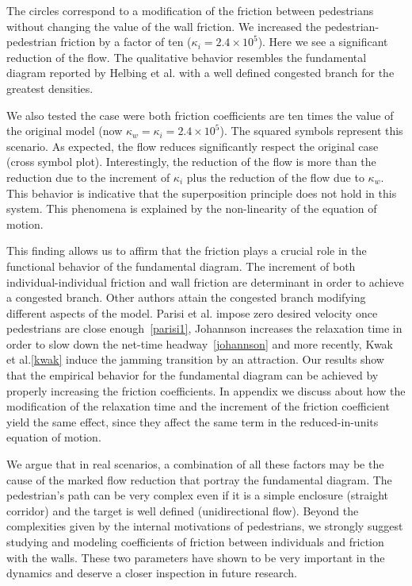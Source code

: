 The circles correspond to a modification of the friction between pedestrians without changing the value of the wall friction. We increased the pedestrian-pedestrian friction by a factor of ten ($\kappa_i = 2.4\times10^{5}$). Here we see a significant reduction of the flow. The qualitative behavior resembles the fundamental diagram reported by Helbing et al. with a well defined congested branch for the greatest densities.

We also tested the case were both friction coefficients are ten times the value of the original model (now $\kappa_w = \kappa_i = 2.4\times10^{5}$). The squared symbols represent this scenario. As expected, the flow reduces significantly respect the original case (cross symbol plot). Interestingly, the reduction of the flow is more than the reduction due to the increment of $\kappa_i$ plus the reduction of the flow due to $\kappa_w$. This behavior is indicative that the superposition principle does not hold in this system. This phenomena is explained by the non-linearity of the equation of motion.   

This finding allows us to affirm that the friction plays a crucial role in the functional behavior of the fundamental diagram. The increment of both individual-individual friction and wall friction are determinant in order to achieve a congested branch. Other authors attain the congested branch modifying different aspects of the model. Parisi et al. impose zero desired velocity once pedestrians are close enough~\ref{parisi1}, Johannson increases the relaxation time in order to slow down the net-time headway~\ref{johannson} and more recently, Kwak et al.\ref{kwak} induce the jamming transition by an attraction. Our results show that the empirical behavior for the fundamental diagram can be achieved by properly increasing the friction coefficients. In appendix we discuss about how the modification of the relaxation time and the increment of the friction coefficient yield the same effect, since they affect the same term in the reduced-in-units equation of motion.  

We argue that in real scenarios, a combination of all these factors may be the cause of the marked flow reduction that portray the fundamental diagram. The pedestrian's path can be very complex even if it is a simple enclosure (straight corridor) and the target is well defined (unidirectional flow). Beyond the complexities given by the internal motivations of pedestrians, we strongly suggest studying and modeling coefficients of friction between individuals and friction with the walls. These two parameters have shown to be very important in the dynamics and deserve a closer inspection in future research. 


